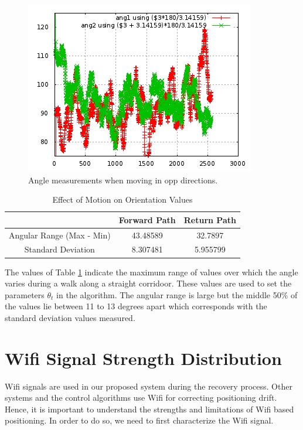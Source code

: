 \begin{figure}\centering
    \includegraphics{figures/angle_180_corridoor.png}
    \caption{Angle measurements when moving in opp directions.\label{fig:angle_180_corridoor}}
\end{figure}

\begin{table}
\centering
\begin{tabular}{c c c}
\hline
\hline
 & Forward Path & Return Path \\
\hline
Angular Range (Max - Min) & 43.48589 & 32.7897 \\
Standard Deviation & 8.307481 & 5.955799 \\
\hline
\end{tabular}
\caption{Effect of Motion on Orientation Values\label{tbl:angle_motion}}
\end{table}

The values of Table \ref{tbl:angle_motion} indicate the maximum range of 
values over which the angle varies during a walk along a straight corridoor. 
These values are used to set the parameters $\theta_t$ in the algorithm.
The angular range is large but the middle 50\% of the values lie 
between 11 to 13 degrees apart which corresponds with the standard deviation
values measured.

\section{Wifi Signal Strength Distribution}

Wifi signals are used in our proposed system during the recovery process.
Other systems and the control algorithms use Wifi for correcting positioning
drift. Hence, it is important to understand the strengths and limitations of 
Wifi based positioning. In order to do so, we need to first characterize
the Wifi signal.

